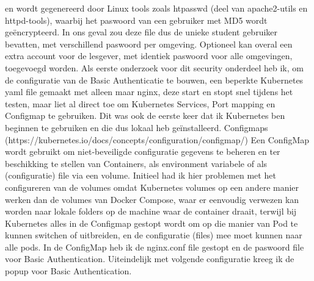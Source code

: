 en wordt gegenereerd door Linux tools zoals htpasswd (deel van apache2-utils en httpd-tools), waarbij het paswoord van een gebruiker met MD5 wordt geëncrypteerd. In ons geval zou deze file dus de unieke student gebruiker bevatten, met verschillend paswoord per omgeving.
Optioneel kan overal een extra account voor de lesgever, met identiek paswoord voor alle omgevingen, toegevoegd worden.
\newline
\newline
Als eerste onderzoek voor dit security onderdeel heb ik, om de configuratie van de Basic Authenticatie te bouwen, een beperkte Kubernetes yaml file gemaakt met alleen maar nginx, deze start en stopt snel tijdens het testen, maar liet al direct toe om Kubernetes Services, Port mapping en Configmap te gebruiken. Dit was ook de eerste keer dat ik Kubernetes ben beginnen te gebruiken en die dus lokaal heb geïnstalleerd.
\newline
\newline
Configmaps (https://kubernetes.io/docs/concepts/configuration/configmap/)
Een ConfigMap wordt gebruikt om niet-beveiligde configuratie gegevens te beheren en ter beschikking te stellen van Containers, als environment variabele of als (configuratie) file via een volume.
\newline
\newline
Initieel had ik hier problemen met het configureren van de volumes omdat Kubernetes volumes op een andere manier werken dan de volumes van Docker Compose, waar er eenvoudig verwezen kan worden naar lokale folders op de machine waar de container draait, terwijl bij Kubernetes alles in de Configmap gestopt wordt om op die manier van Pod te kunnen switchen of uitbreiden, en de configuratie (files) mee moet kunnen naar alle pods.
\newline
\newline
In de ConfigMap heb ik de nginx.conf file gestopt en de paswoord file voor Basic Authentication.
Uiteindelijk met volgende configuratie kreeg ik de popup voor Basic Authentication.
\newpage
